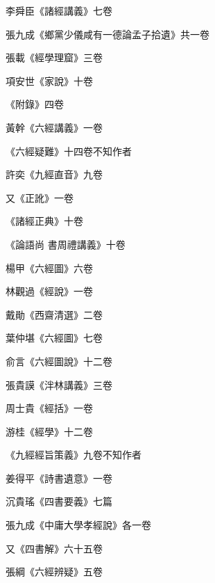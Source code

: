 \begin{pinyinscope}
 李舜臣《諸經講義》七卷



 張九成《鄉黨少儀咸有一德論孟子拾遺》共一卷



 張載《經學理窟》三卷



 項安世《家說》十卷



 《附錄》四卷



 黃幹《六經講義》一卷



 《六經疑難》十四卷不知作者



 許奕《九經直音》九卷



 又《正訛》一卷



 《諸經正典》十卷



 《論語尚
 書周禮講義》十卷



 楊甲《六經圖》六卷



 林觀過《經說》一卷



 戴勛《西齋清選》二卷



 葉仲堪《六經圖》七卷



 俞言《六經圖說》十二卷



 張貴謨《泮林講義》三卷



 周士貴《經括》一卷



 游桂《經學》十二卷



 《九經經旨策義》九卷不知作者



 姜得平《詩書遺意》一卷



 沉貴瑤《四書要義》七篇



 張九成《中庸大學孝經說》各一卷



 又《四書解》六十五卷



 張綱《六經辨疑》五卷




\end{pinyinscope}
